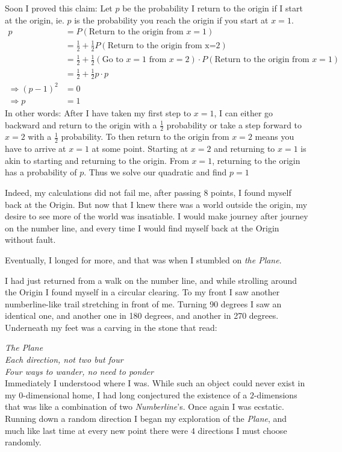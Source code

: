 \documentclass{article}
\begin{document}
Soon I proved this claim: Let $p$ be the probability I return to the origin if I start at the origin, ie. $p$ is the probability you reach the origin if you start at $x=1$.
\begin{align*}
    p &= P\left(\text{Return to the origin from $x=1$}\right)\\ 
    &= \frac{1}{2} + \frac{1}{2}P\left(\text{Return to the origin from x=2}\right)\\
    &=\frac{1}{2} + \frac{1}{2}\left(\text{Go to $x=1$ from $x=2$}\right) \cdot P\left(\text{Return to the origin from $x=1$}\right)\\
    &=\frac{1}{2} + \frac{1}{2}p\cdot p\\
    \Rightarrow     (p-1)^2&=0\\
    \Rightarrow          p&=1
\end{align*}
In other words: After I have taken my first step to $x=1$, I can either go backward and return to the origin with a $\frac{1}{2}$ probability or take a step forward to $x=2$ with a $\frac{1}{2}$ probability. To then return to the origin from $x=2$ means you have to arrive at $x=1$ at some point. Starting at $x=2$ and returning to $x=1$ is akin to starting and returning to the origin. From $x=1$, returning to the origin has a probability of $p$. Thus we solve our quadratic and find $p=1$


Indeed, my calculations did not fail me, after passing $8$ points, I found myself back at the Origin. But now that I knew there was a world outside the origin, my desire to see more of the world was insatiable. I would make journey after journey on the number line, and every time I would find myself back at the Origin without fault.

Eventually, I longed for more, and that was when I stumbled on \emph{the Plane}. 

I had just returned from a walk on the number line, and while strolling around the Origin I found myself in a circular clearing. To my front I saw another numberline-like trail stretching in front of me. Turning 90 degrees I saw an identical one, and another one in 180 degrees, and another in 270 degrees. Underneath my feet was a carving in the stone that read:

\emph{The Plane\\
Each direction, not two but four\\
Four ways to wander, no need to ponder
}\\

Immediately I understood where I was. While such an object could never exist in my $0$-dimensional home, I had long conjectured the existence of a $2$-dimensions that was like a combination of two \emph{Numberline}'s. Once again I was ecstatic. Running down a random direction I began my exploration of the \emph{Plane}, and much like last time at every new point there were $4$ directions I must choose randomly.
\end{document}
